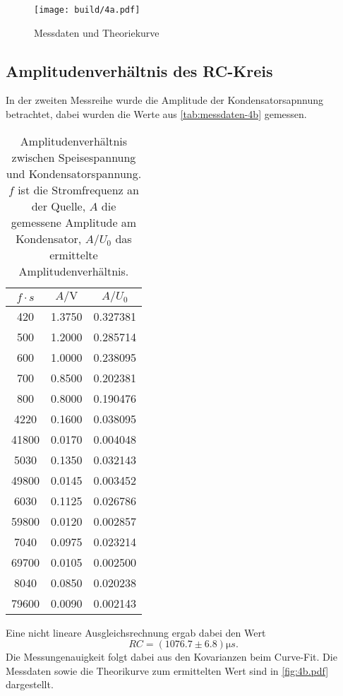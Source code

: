 \begin{figure}[H]
	\centering
	\texttt{[image: build/4a.pdf]}
	\caption{Messdaten und Theoriekurve}
	\label{fig:plot-4a}
\end{figure}


\subsection{Amplitudenverhältnis des RC-Kreis}
\label{sec:4b-auswertung}
In der zweiten Messreihe wurde die Amplitude der Kondensatorsapnnung betrachtet, dabei 
wurden die Werte aus \autoref{tab:messdaten-4b} gemessen.

\begin{table}
	\centering
	\caption{Amplitudenverhältnis zwischen Speisespannung und Kondensatorspannung.
	$f$ ist die Stromfrequenz an der Quelle, $A$ die gemessene Amplitude am 
	Kondensator, $A/U_0$ das ermittelte Amplitudenverhältnis.}
	\label{tab:messdaten-4b}
	\begin{tabular}{c c c}
		\toprule
		$f \cdot \si{s}$ & $A / \si{\volt}$  & $A / U_0$ \\
		\midrule
		 420   & 1.3750  & 0.327381 \\
	         500  & 1.2000  & 0.285714 \\
	         600  & 1.0000  & 0.238095 \\
	         700  & 0.8500  & 0.202381 \\
	         800  & 0.8000  & 0.190476 \\
	        4220  & 0.1600  & 0.038095 \\
	       41800  & 0.0170  & 0.004048 \\
	        5030  & 0.1350  & 0.032143 \\
	       49800  & 0.0145  & 0.003452 \\
	        6030  & 0.1125  & 0.026786 \\
	       59800  & 0.0120  & 0.002857 \\
	        7040  & 0.0975  & 0.023214 \\
	       69700  & 0.0105  & 0.002500 \\
	        8040  & 0.0850  & 0.020238 \\
	       79600  & 0.0090  & 0.002143 \\
		\bottomrule
	\end{tabular}
\end{table}

Eine nicht lineare Ausgleichsrechnung ergab dabei den Wert
\begin{equation}
	RC = (1076.7 \pm 6.8) \si{\micro s}.
	\label{eqn:ergebnis-4b}
\end{equation}
Die Messungenauigkeit folgt dabei aus den Kovarianzen beim Curve-Fit. Die Messdaten sowie
die Theorikurve zum ermittelten Wert sind in  \autoref{fig:4b.pdf} dargestellt.

